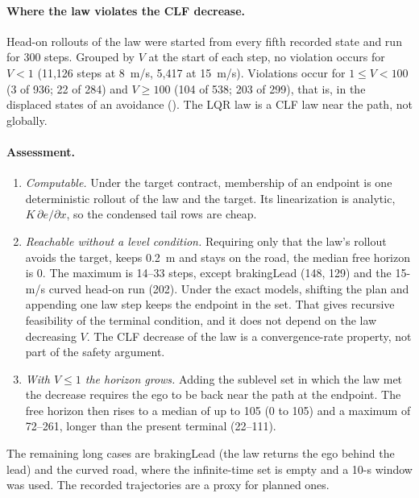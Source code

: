 \documentclass[11pt]{article}
\begin{document}
\paragraph{Where the law violates the CLF decrease.} Head-on rollouts of the law
were started from every fifth recorded state and run for 300 steps. Grouped by $V$ at the start
of each step, no violation occurs for $V<1$ (11{,}126 steps at 8~m/s, 5{,}417 at
15~m/s). Violations occur for $1\le V<100$ (3 of 936; 22 of 284) and
$V\ge100$ (104 of 538; 203 of 299), that is, in the displaced states of an
avoidance (). The LQR law is a CLF law near the path,
not globally.

\paragraph{Assessment.}
\begin{enumerate}
\item \emph{Computable.} Under the target contract, membership of an endpoint
  is one deterministic rollout of the law and the target. Its linearization
  is analytic, $K\,\partial e/\partial x$, so the condensed tail rows are
  cheap.
\item \emph{Reachable without a level condition.} Requiring only that the law's
  rollout avoids the target, keeps 0.2~m and stays on the road, the median free
  horizon is 0. The maximum is 14--33 steps, except brakingLead (148, 129) and
  the 15-m/s curved head-on run (202). Under the exact models, shifting the plan
  and appending one law step keeps the endpoint in the set. That gives
  recursive feasibility of the terminal condition, and it does not depend on
  the law decreasing $V$. The CLF decrease of the law is a convergence-rate
  property, not part of the safety argument.
\item \emph{With $V\le1$ the horizon grows.} Adding the sublevel set in which
  the law met the decrease requires the ego to be back near the path at the
  endpoint. The free horizon then rises to a median of up to 105 (0 to 105) and a maximum of 72--261, longer
  than the present terminal (22--111).
\end{enumerate}
The remaining long cases are brakingLead (the law returns the ego behind the
lead) and the curved road, where the infinite-time set is empty and a 10-s
window was used. The recorded trajectories are a proxy for planned ones.
\end{document}
